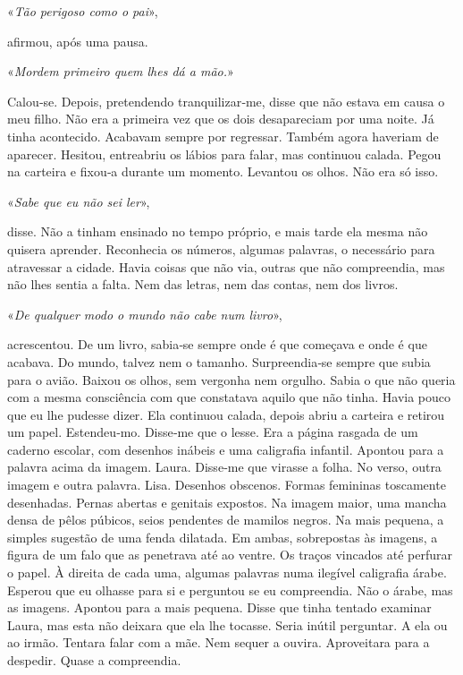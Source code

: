 «\emph{Tão perigoso como o pai}»,

afirmou, após uma pausa.

«\emph{Mordem primeiro quem lhes dá a mão.}»

Calou­‑se. Depois, pretendendo tranquilizar­‑me, disse que não estava em
causa o meu filho. Não era a primeira vez que os dois desapareciam por
uma noite. Já tinha acontecido. Acabavam sempre por regressar. Também
agora haveriam de aparecer. Hesitou, entreabriu os lábios para falar,
mas continuou calada. Pegou na carteira e fixou­‑a durante um momento.
Levantou os olhos. Não era só isso.

«\emph{Sabe que eu não sei ler}»,

disse. Não a tinham ensinado no tempo próprio, e mais tarde ela mesma
não quisera aprender. Reconhecia os números, algumas palavras, o
necessário para atravessar a cidade. Havia coisas que não via, outras
que não compreendia, mas não lhes sentia a falta. Nem das letras, nem
das contas, nem dos livros.

«\emph{De qualquer modo o mundo não cabe num livro}»,

acrescentou. De um livro, sabia­‑se sempre onde é que começava e onde é
que acabava. Do mundo, talvez nem o tamanho. Surpreendia­‑se sempre que
subia para o avião. Baixou os olhos, sem vergonha nem orgulho. Sabia o
que não queria com a mesma consciência com que constatava aquilo que não
tinha. Havia pouco que eu lhe pudesse dizer. Ela continuou calada,
depois abriu a carteira e retirou um papel. Estendeu­‑mo. Disse­‑me que
o lesse. Era a página rasgada de um caderno escolar, com desenhos
inábeis e uma caligrafia infantil. Apontou para a palavra acima da
imagem. Laura. Disse­‑me que virasse a folha. No verso, outra imagem e
outra palavra. Lisa. Desenhos obscenos. Formas femininas toscamente
desenhadas. Pernas abertas e genitais expostos. Na imagem maior, uma
mancha densa de pêlos púbicos, seios pendentes de mamilos negros. Na
mais pequena, a simples sugestão de uma fenda dilatada. Em ambas,
sobrepostas às imagens, a figura de um falo que as penetrava até ao
ventre. Os traços vincados até perfurar o papel. À direita de cada uma,
algumas palavras numa ilegível caligrafia árabe. Esperou que eu olhasse
para si e perguntou se eu compreendia. Não o árabe, mas as imagens.
Apontou para a mais pequena. Disse que tinha tentado examinar Laura, mas
esta não deixara que ela lhe tocasse. Seria inútil perguntar. A ela ou
ao irmão. Tentara falar com a mãe. Nem sequer a ouvira. Aproveitara para
a despedir. Quase a compreendia.

